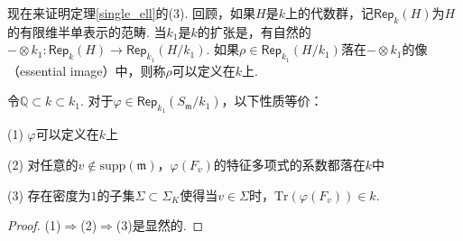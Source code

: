 现在来证明定理\ref{single_ell}的(3). 回顾，如果$H$是$k$上的代数群，记$\mathsf{Rep}_k(H)$为$H$的有限维半单表示的范畴. 当$k_1$是$k$的扩张是，有自然的$-\otimes k_1: \mathsf{Rep}_k(H)\to \mathsf{Rep}_{k_1}(H/k_1)$. 如果$\rho\in \mathsf{Rep}_{k_1}(H/k_1)$落在$-\otimes k_1$的像（essential image）中，则称$\rho$可以定义在$k$上.

\begin{cprop}
    令$\mathbb{Q}\subset k\subset k_1$. 对于$\varphi\in \mathsf{Rep}_{k_1}(S_{\mathfrak{m}}/k_1)$，以下性质等价：

    (1) $\varphi$可以定义在$k$上

    (2) 对任意的$v\not\in \mathrm{supp}(\mathfrak{m})$，$\varphi(F_v)$的特征多项式的系数都落在$k$中

    (3) 存在密度为$1$的子集$\Sigma \subset \Sigma_K$使得当$v\in \Sigma$时，$\mathrm{Tr}(\varphi(F_v))\in k$.
\end{cprop}

\begin{proof}
    (1)$\Rightarrow$(2)$\Rightarrow$(3)是显然的.
\end{proof}




